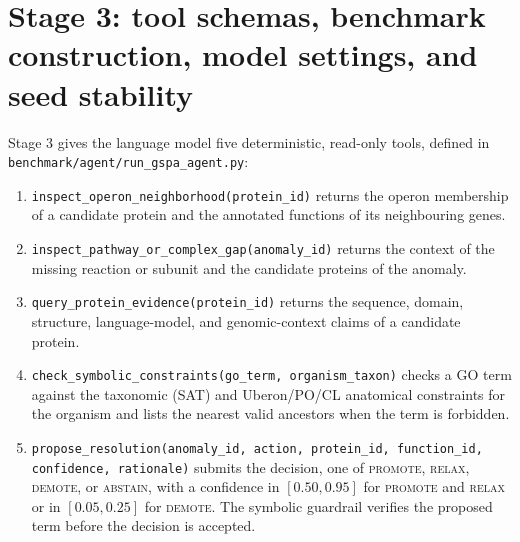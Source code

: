 \documentclass[10pt]{article}
\newcommand{\fn}[1]{\nolinkurl{#1}}
\begin{document}


\section{Stage 3: tool schemas, benchmark construction, model settings, and seed stability}
\label{sec:supp_agent}

Stage 3 gives the language model five deterministic, read-only tools, defined in \fn{benchmark/agent/run_gspa_agent.py}:
\begin{enumerate}
  \item \fn{inspect_operon_neighborhood(protein_id)} returns the operon membership of a candidate protein and the annotated functions of its neighbouring genes.
  \item \fn{inspect_pathway_or_complex_gap(anomaly_id)} returns the context of the missing reaction or subunit and the candidate proteins of the anomaly.
  \item \fn{query_protein_evidence(protein_id)} returns the sequence, domain, structure, language-model, and genomic-context claims of a candidate protein.
  \item \fn{check_symbolic_constraints(go_term, organism_taxon)} checks a GO term against the taxonomic (SAT) and Uberon/PO/CL anatomical constraints for the organism and lists the nearest valid ancestors when the term is forbidden.
  \item \fn{propose_resolution(anomaly_id, action, protein_id, function_id, confidence, rationale)} submits the decision, one of \textsc{promote}, \textsc{relax}, \textsc{demote}, or \textsc{abstain}, with a confidence in $[0.50, 0.95]$ for \textsc{promote} and \textsc{relax} or in $[0.05, 0.25]$ for \textsc{demote}. The symbolic guardrail verifies the proposed term before the decision is accepted.
\end{enumerate}
\end{document}
